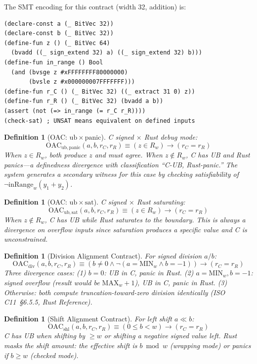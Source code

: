\documentclass[11pt]{article}
\newtheorem{definition}[theorem]{Definition}
\newcommand{\OAC}{\mathrm{OAC}}
\newcommand{\inRange}{\mathrm{inRange}}
\begin{document}
The SMT encoding for this contract (width 32, addition) is:
\begin{lstlisting}[language=SMT, caption={SMT encoding for $\OAC_{\mathrm{ub},\mathrm{wrap}}$}]
(declare-const a (_ BitVec 32))
(declare-const b (_ BitVec 32))
(define-fun z () (_ BitVec 64)
  (bvadd ((_ sign_extend 32) a) ((_ sign_extend 32) b)))
(define-fun in_range () Bool
  (and (bvsge z #xFFFFFFFF80000000)
       (bvsle z #x000000007FFFFFFF)))
(define-fun r_C () (_ BitVec 32) ((_ extract 31 0) z))
(define-fun r_R () (_ BitVec 32) (bvadd a b))
(assert (not (=> in_range (= r_C r_R))))
(check-sat) ; UNSAT means equivalent on defined inputs
\end{lstlisting}

\begin{definition}[OAC: $\mathrm{ub} \times \mathrm{panic}$]
\label{def:oac-ub-panic}
C signed $\times$ Rust debug mode:
\[
\OAC_{\mathrm{ub},\mathrm{panic}}(a, b, r_C, r_R) \equiv (z \in R_w) \to (r_C = r_R)
\]
When $z \in R_w$, both produce $z$ and must agree. When $z \notin R_w$, C has UB and Rust panics---a definedness divergence with classification ``C-UB, Rust-panic.'' The system generates a secondary witness for this case by checking satisfiability of $\neg\inRange_w(y_1 + y_2)$.
\end{definition}

\begin{definition}[OAC: $\mathrm{ub} \times \mathrm{sat}$]
\label{def:oac-ub-sat}
C signed $\times$ Rust saturating:
\[
\OAC_{\mathrm{ub},\mathrm{sat}}(a, b, r_C, r_R) \equiv (z \in R_w) \to (r_C = r_R)
\]
When $z \notin R_w$, C has UB while Rust saturates to the boundary. This is always a divergence on overflow inputs since saturation produces a specific value and C is unconstrained.
\end{definition}

\begin{definition}[Division Alignment Contract]
\label{def:oac-div}
For signed division $a / b$:
\[
\OAC_{\mathrm{div}}(a, b, r_C, r_R) \equiv (b \neq 0 \wedge \neg(a = \mathrm{MIN}_w \wedge b = -1)) \to (r_C = r_R)
\]
Three divergence cases: (1) $b = 0$: UB in C, panic in Rust. (2) $a = \mathrm{MIN}_w, b = -1$: signed overflow (result would be $\mathrm{MAX}_w + 1$), UB in C, panic in Rust. (3) Otherwise: both compute truncation-toward-zero division identically (ISO C11~\S6.5.5, Rust Reference).
\end{definition}

\begin{definition}[Shift Alignment Contract]
\label{def:oac-shift}
For left shift $a \ll b$:
\[
\OAC_{\mathrm{shl}}(a, b, r_C, r_R) \equiv (0 \leq b < w) \to (r_C = r_R)
\]
C has UB when shifting by $\geq w$ or shifting a negative signed value left. Rust masks the shift amount: the effective shift is $b \bmod w$ (wrapping mode) or panics if $b \geq w$ (checked mode).
\end{definition}
\end{document}
